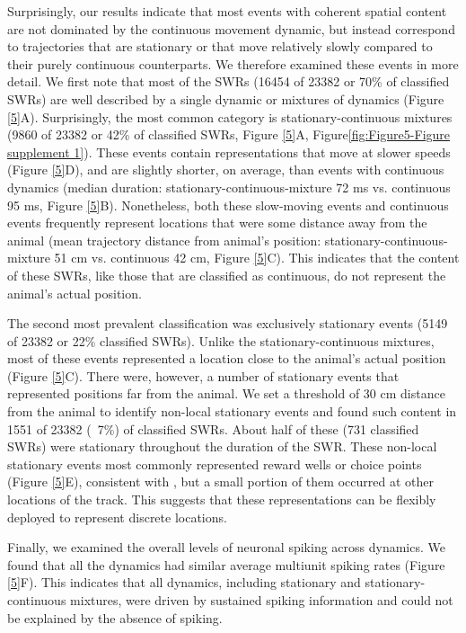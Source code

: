 \documentclass[times, twoside]{zHenriquesLab-StyleBioRxiv}
\begin{document}
Surprisingly, our results indicate that most events with coherent spatial content are not dominated by the continuous movement dynamic, but instead correspond to trajectories that are stationary or that move relatively slowly compared to their purely continuous counterparts. We therefore examined these events in more detail. We first note that most of the SWRs (16454 of 23382 or 70\% of classified SWRs) are well described by a single dynamic or mixtures of dynamics (Figure \ref{5}A). Surprisingly, the most common category is stationary-continuous mixtures (9860 of 23382 or 42\% of classified SWRs, Figure \ref{5}A, Figure\ref{fig:Figure5-Figure supplement 1}). These events contain representations that move at slower speeds (Figure \ref{5}D), and are slightly shorter, on average, than events with continuous dynamics (median duration: stationary-continuous-mixture 72 ms vs. continuous 95 ms, Figure \ref{5}B). Nonetheless, both these slow-moving events and continuous events frequently represent locations that were some distance away from the animal (mean trajectory distance from animal's position: stationary-continuous-mixture 51 cm vs. continuous 42 cm, Figure \ref{5}C). This indicates that the content of these SWRs, like those that are classified as continuous, do not represent the animal's actual position.

The second most prevalent classification was exclusively stationary events (5149 of 23382 or 22\% classified SWRs). Unlike the stationary-continuous mixtures, most of these events represented a location close to the animal's actual position (Figure \ref{5}C). There were, however, a number of stationary events that represented positions far from the animal. We set a threshold of 30 cm distance from the animal to identify non-local stationary events and found such content in 1551 of 23382 (~7\%) of classified SWRs. About half of these (731 classified SWRs) were stationary throughout the duration of the SWR. These non-local stationary events most commonly represented reward wells or choice points (Figure \ref{5}E), consistent with \cite{JaiDistincthippocampalcorticalmemory2017}, but a small portion of them occurred at other locations of the track. This suggests that these representations can be flexibly deployed to represent discrete locations.

Finally, we examined the overall levels of neuronal spiking across dynamics. We found that all the dynamics had similar average multiunit spiking rates (Figure \ref{5}F). This indicates that all dynamics, including stationary and stationary-continuous mixtures, were driven by sustained spiking information and could not be explained by the absence of spiking.
\end{document}

